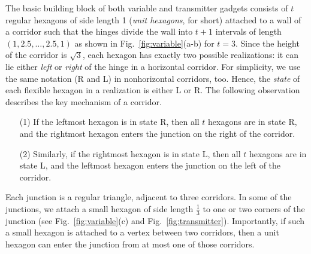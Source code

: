 The basic building block of both variable and transmitter gadgets consists of $t$ regular hexagons of side length 1 (\emph{unit hexagons}, for short) attached to a wall of a corridor such that the hinges divide the wall into $t+1$ intervals of length $(1,2.5,\ldots ,2.5,1)$ as shown in Fig.~\ref{fig:variable}(a-b) for $t=3$. Since the height of the corridor is $\sqrt{3}$, each hexagon has exactly two possible realizations: it can lie either \emph{left} or \emph{right} of the hinge in a horizontal corridor. For simplicity, we use the same notation (R and L) in nonhorizontal corridors, too. Hence, the \emph{state} of each flexible hexagon in a realization is either L or R. The following observation describes the key mechanism of a corridor.

\begin{observation}\label{obs:corridor}
\begin{itemize}
\item[]
\item[(1)] If the leftmost hexagon is in state R, then all $t$ hexagons are in state R, and the rightmost hexagon enters the junction on the right of the corridor.
\item[(2)] Similarly, if the rightmost hexagon is in state L, then all $t$ hexagons are in state L, and the leftmost hexagon enters the junction on the left of the corridor.
\end{itemize}
\end{observation}

Each junction is a regular triangle, adjacent to three corridors. In some of the junctions, we attach a small hexagon of side length $\frac{1}{3}$ to one or two corners of the junction (see Fig.~\ref{fig:variable}(c) and Fig.~\ref{fig:transmitter}). Importantly, if such a small hexagon is attached to a vertex between two corridors, then a unit hexagon can enter the junction from at most one of those corridors.
